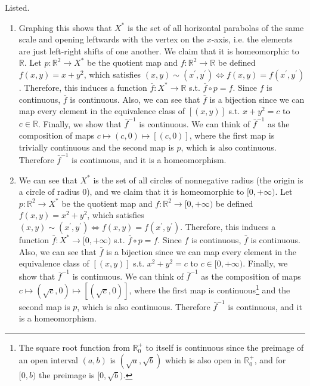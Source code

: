   \begin{solution}
    Listed. 
    \begin{enumerate}
      \item Graphing this shows that $X^\ast$ is the set of all horizontal parabolas of the same scale and opening leftwards with the vertex on the $x$-axis, i.e. the elements are just left-right shifts of one another. We claim that it is homeomorphic to $\mathbb{R}$. Let $p: \mathbb{R}^2 \rightarrow X^\ast$ be the quotient map and $f: \mathbb{R}^2 \rightarrow \mathbb{R}$ be defined $f(x, y) = x + y^2$, which satisfies $(x,y) \sim (x^\prime, y^\prime) \iff f(x, y) = f(x^\prime, y^\prime)$. Therefore, this induces a function $\bar{f}: X^\ast  \rightarrow \mathbb{R}$ s.t. $\bar{f} \circ p = f$. Since $f$ is continuous, $\bar{f}$ is continuous. Also, we can see that $\bar{f}$ is a bijection since we can map every element in the equivalence class of $[(x, y)]$ s.t. $x + y^2 = c$ to $c \in \mathbb{R}$. Finally, we show that $\bar{f}^{-1}$ is continuous. We can think of $\bar{f}^{-1}$ as the composition of maps $c \mapsto (c, 0) \mapsto [(c, 0)]$, where the first map is trivially continuous and the second map is $p$, which is also continuous. Therefore $\bar{f}^{-1}$ is continuous, and it is a homeomorphism. 
        
      \item We can see that $X^\ast$ is the set of all circles of nonnegative radius (the origin is a circle of radius $0$), and we claim that it is homeomorphic to $[0, +\infty)$. Let $p: \mathbb{R}^2 \rightarrow X^\ast$ be the quotient map and $f: \mathbb{R}^2 \rightarrow [0, +\infty)$ be defined $f(x, y) = x^2 + y^2$, which satisfies $(x,y) \sim (x^\prime, y^\prime) \iff f(x, y) = f(x^\prime, y^\prime)$. Therefore, this induces a function $\bar{f}: X^\ast  \rightarrow [0, +\infty)$ s.t. $\bar{f} \circ p = f$. Since $f$ is continuous, $\bar{f}$ is continuous. Also, we can see that $\bar{f}$ is a bijection since we can map every element in the equivalence class of $[(x, y)]$ s.t. $x^2 + y^2 = c$ to $c \in [0, +\infty)$. Finally, we show that $\bar{f}^{-1}$ is continuous. We can think of $\bar{f}^{-1}$ as the composition of maps $c \mapsto (\sqrt{c}, 0) \mapsto [(\sqrt{c}, 0)]$, where the first map is continuous\footnote{The square root function from $\mathbb{R}_0^+$ to itself is continuous since the preimage of an open interval $(a, b)$ is $(\sqrt{a}, \sqrt{b})$ which is also open in $\mathbb{R}_0^+$, and for $[0, b)$ the preimage is $[0, \sqrt{b})$.} and the second map is $p$, which is also continuous. Therefore $\bar{f}^{-1}$ is continuous, and it is a homeomorphism. 
    \end{enumerate}
  \end{solution}

